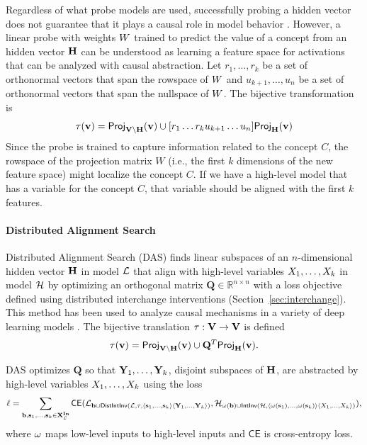 \documentclass[twoside,11pt]{article}
\begin{document}
Regardless of what probe models are used, successfully probing a hidden vector does not guarantee that it plays a causal role in model behavior \citep{ravichander2020probing,Elazar-etal-2020, geiger-etal:2020:blackbox,geiger2021causal}. However, a linear probe with weights $W$ trained to predict the value of a concept from an hidden vector $\mathbf{H}$ can be understood as learning a feature space for activations that can be analyzed with causal abstraction. Let $r_1, \dots, r_k$ be a set of orthonormal vectors that span the rowspace of $W$ and $u_{k+1}, \dots, u_{n}$ be a set of orthonormal vectors that span the nullspace of $W$. The bijective transformation is
\[\tau(\mathbf{v}) = \mathsf{Proj}_{\mathbf{V} \setminus \mathbf{H}}(\mathbf{v}) \cup [r_1 \dots r_k u_{k+1} \dots u_{n}]\mathsf{Proj}_{\mathbf{H}}(\mathbf{v})\]
Since the probe is trained to capture information related to the concept $C$, the rowspace of the projection matrix $W$ (i.e., the first $k$ dimensions of the new feature space) might localize the concept $C$. If we have a high-level model that has a variable for the concept $C$, that variable should be aligned with the first $k$ features.


\paragraph{Distributed Alignment Search}\label{sec:DAS}
Distributed Alignment Search (DAS) finds linear subspaces of an $n$-dimensional hidden vector $\mathbf{H}$ in model $\mathcal{L}$ that align with high-level variables $X_1, \dots, X_k$ in model $\mathcal{H}$ by optimizing an orthogonal matrix $\mathbf{Q} \in \mathbb{R}^{n \times n}$ with a loss objective defined using distributed interchange interventions (Section~\ref{sec:interchange}). This method has been used to analyze causal mechanisms in a variety of deep learning models \citep{Geiger-etal:2023:DAS,Wu:Geiger:2023:BDAS, tigges2023linear, arora2024causalgym, huang2024ravel, minder2024}. The bijective translation $\tau: \mathbf{V} \to \mathbf{V}$ is defined
\[\tau(\mathbf{v}) = \mathsf{Proj}_{\mathbf{V} \setminus \mathbf{H}}(\mathbf{v}) \cup \mathbf{Q}^{T} \mathsf{Proj}_{\mathbf{H}}(\mathbf{v}).\]

DAS optimizes $\mathbf{Q}$ so that $\mathbf{Y}_1, \dots, \mathbf{Y}_k$, disjoint subspaces of $\mathbf{H}$, are abstracted by high-level variables $X_1, \dots, X_k$ using the loss
\[
\ell = \sum_{\mathbf{b}, \mathbf{s}_1, \dots, \mathbf{s}_k \in \mathbf{X}^{\mathbf{In}}_{\mathcal{L}}}\mathsf{CE}(\mathcal{L}_{\mathbf{b} \cup \mathsf{DistIntInv}(\mathcal{L}, \tau, \langle \mathbf{s}_1,\dots, \mathbf{s}_k\rangle\langle\mathbf{Y}_1, \dots, \mathbf{Y}_k \rangle)}, \mathcal{H}_{\omega(\mathbf{b}) \cup \mathsf{IntInv}(\mathcal{H}, \langle \omega(\mathbf{s}_1),\dots, \omega(\mathbf{s}_k)\rangle\langle X_1, \dots, X_k \rangle)}),
\]
where $\omega$ maps low-level inputs to high-level inputs and $\mathsf{CE}$ is cross-entropy loss. 
\end{document}
